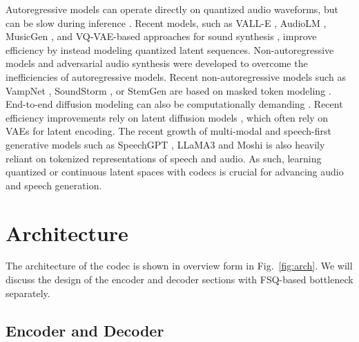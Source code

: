 \documentclass{article} %
\begin{document}
{Autoregressive models} can operate directly on quantized audio waveforms, but can be slow during inference \citep{oord2016wavenet}. Recent models, such as VALL-E \citep{wang2023neural}, AudioLM \citep{borsos2023audiolm}, MusicGen \citep{copet2023simple}, and VQ-VAE-based approaches for sound synthesis \citep{liu2021conditional}, improve efficiency by instead modeling quantized latent sequences. {Non-autoregressive models} \citep{oord2018parallel} and adversarial audio synthesis \citep{donahue2018adversarial} were developed to overcome the inefficiencies of autoregressive models. Recent non-autoregressive models such as VampNet \citep{garcia2023vampnet}, SoundStorm \citep{borsos2023soundstorm}, or StemGen \citep{stemgen} are based on masked token modeling \citep{chang2022maskgit}. End-to-end diffusion modeling can also be computationally demanding \citep{rouard2021crash, pascual2023full}. Recent efficiency improvements rely on latent diffusion models \citep{liu2023audioldm, liu2024audioldm, yuan2024retrieval, evans2024fast, evans2024long, evans2024stable, yang2024simplespeech}, which often rely on VAEs for latent encoding. The recent growth of multi-modal and speech-first generative models such as SpeechGPT \citep{zhang2023speechgpt}, LLaMA3 \citep{llama3} and Moshi \citep{moshi} is also heavily reliant on tokenized representations of speech and audio. As such, learning quantized or continuous latent spaces with codecs is crucial for advancing audio and speech generation. 


\section{Architecture}
The architecture of the codec is shown in overview form in Fig.~\ref{fig:arch}. We will discuss the design of the encoder and decoder sections with FSQ-based bottleneck separately.
\subsection{Encoder and Decoder}
\end{document}
